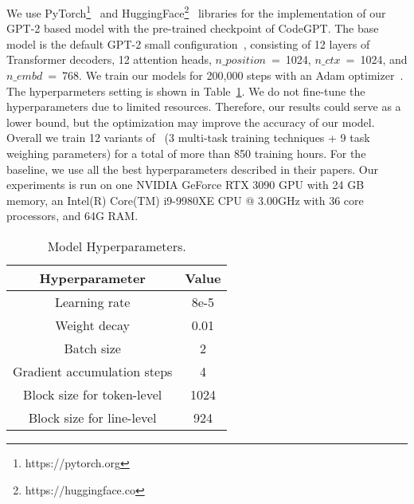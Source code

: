 We use PyTorch\footnote{https://pytorch.org}~\cite{paszke2019pytorch} and HuggingFace\footnote{https://huggingface.co}~\cite{wolf2019huggingface} libraries for the implementation of our GPT-2 based model with the pre-trained checkpoint of CodeGPT.
The base model is the default GPT-2 small configuration~\cite{radford2019language},   consisting of 12 layers of Transformer decoders, 12 attention heads, $n\_position$~=~1024, $n\_ctx$~=~1024, and $n\_embd$~=~768.
We train our models for 200,000 steps with an Adam optimizer~\cite{kingma2014adam}. 
The hyperparmeters setting is shown in Table~\ref{tab:1}.
We do not fine-tune the hyperparameters due to limited resources.
Therefore, our results could serve as a lower bound, but the optimization may improve the accuracy of our model.
Overall we train 12 variants of \our~(3 multi-task training techniques + 9 task weighing parameters) for a total of more than 850 training hours.
For the baseline, we use all the best hyperparameters described in their papers.
Our experiments is run on one NVIDIA GeForce RTX 3090 GPU with 24 GB memory, an Intel(R) Core(TM) i9-9980XE CPU @ 3.00GHz with 36 core processors, and 64G RAM.




\begin{table}[]
    \centering
    \begin{tabular}{c|c}
        Hyperparameter & Value \\
        \hline
        Learning rate & 8e-5 \\
        Weight decay & 0.01 \\ 
        Batch size & 2 \\
        Gradient accumulation steps & 4 \\
        Block size for token-level & 1024 \\ 
        Block size for line-level & 924 \\
    \end{tabular}
    \caption{Model Hyperparameters.}
    \label{tab:1}
\end{table}

